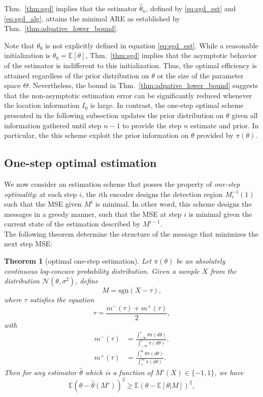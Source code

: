 \documentclass[letterpaper, conference,9pt]{IEEEtran}      %
\newtheorem{thm}{\bf{Theorem}}
\newcommand{\sgn}{\mathrm{sgn} }
\begin{document}
Thm.~\ref{thm:sgd} implies that the estimator $\widehat{\theta}_n$, defined by \eqref{eq:sgd_est} and \eqref{eq:sgd_alg}, attains the minimal ARE as established by Thm.~\ref{thm:adpative_lower_bound}.
\par
Note that $\theta_0$ is not explicitly defined 
in equation \eqref{eq:sgd_est}. While a reasonable initialization is $\theta_0 = \mathbb E [\theta]$,  Thm.~\ref{thm:sgd} implies that the asymptotic behavior of the estimator is indifferent to this initialization. Thus, the optimal efficiency is attained regardless of the prior distribution on $\theta$ or the size of the parameter space $\Theta$. Nevertheless, the bound in Thm.~\ref{thm:adpative_lower_bound} suggests that the non-asymptotic estimation error can be significantly reduced whenever the location information $I_0$ is large. In contrast, the one-step optimal scheme presented in the following subsection updates the prior distribution on $\theta$ given all information gathered until step $n-1$ to provide the step $n$ estimate and prior. In particular, the this scheme exploit the prior information on $\theta$ provided by $\pi(\theta)$. 

\subsection{One-step optimal estimation}
We now consider an estimation scheme that posses the property of \emph{one-step optimality}: at each step $i$, the $i$th encoder designs the detection region $M_i^{-1}(1)$ such that the MSE given $M^i$ is minimal. In other word, this scheme designs the messages in a greedy manner, such that the MSE at step $i$ is minimal given the current state of the estimation described by $M^{i-1}$. \\

The following theorem determine the structure of the message that minimizes the next step MSE:
\begin{thm}[optimal one-step estimation] \label{thm:opt_one_step}
Let $\pi(\theta)$ be an absolutely continuous log-concave probability distribution. Given a sample $X$ from the distribution $\mathcal N(\theta, \sigma^2)$, define 
\begin{equation}
\label{eq:adaptive_main_message}
M = \sgn(X - \tau),
\end{equation}
where $\tau$ satisfies the equation
\begin{equation}
 \label{eq:fixed_point}
 \tau = \frac{m^-(\tau) + m^+(\tau)}{2},
\end{equation}
with
\begin{align*}
m^-(\tau)  & = \frac{\int_{-\infty}^{\tau} \theta \pi(d\theta) }{\int_{-\infty}^{\tau} \pi(d\theta)} ,\\
m^+(\tau) & = \frac{\int_{\tau}^\infty \theta \pi(d\theta) }{\int_{\tau}^\infty \pi(d\theta)} .
\end{align*}
Then for any estimator $\widehat{\theta}$ which is a function of $M'(X) \in \{-1,1\}$, we have
\begin{equation}
\label{eq:opt_cond}
\mathbb E \left(\theta-\widehat{\theta}(M')\right)^2 \geq  \mathbb E \left(\theta- \mathbb E[\theta|M]\right)^2,
\end{equation}
\end{thm}
\end{document}
